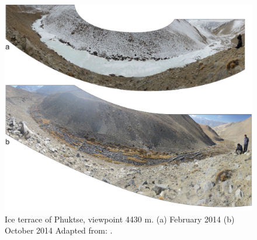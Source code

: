 \begin{figure}[htb]
	\centering
	\includegraphics[width=\textwidth]{figs/IT_example.png}
	\caption{Ice terrace of Phuktse, viewpoint 4430 m. (a) February 2014 (b) October 2014 Adapted from:
		\citet{nusserSociohydrologyArtificialGlaciers2019}.}
	\label{fig:ITexample}
\end{figure}

%
%
%
%


